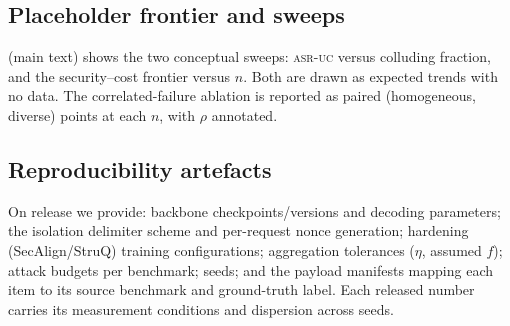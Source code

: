 \subsection{Placeholder frontier and sweeps}
 (main text) shows the two conceptual sweeps: \textsc{asr-uc} versus
colluding fraction, and the security--cost frontier versus $n$. Both are drawn as expected
trends with no data. The correlated-failure ablation is reported as paired
(homogeneous, diverse) points at each $n$, with $\rho$ annotated.

\subsection{Reproducibility artefacts}
On release we provide: backbone checkpoints/versions and decoding parameters; the isolation
delimiter scheme and per-request nonce generation; hardening (SecAlign/StruQ) training
configurations; aggregation tolerances ($\eta$, assumed $f$); attack budgets per benchmark;
seeds; and the payload manifests mapping each item to its source benchmark and ground-truth
label. Each released number carries its measurement conditions and dispersion across seeds.
